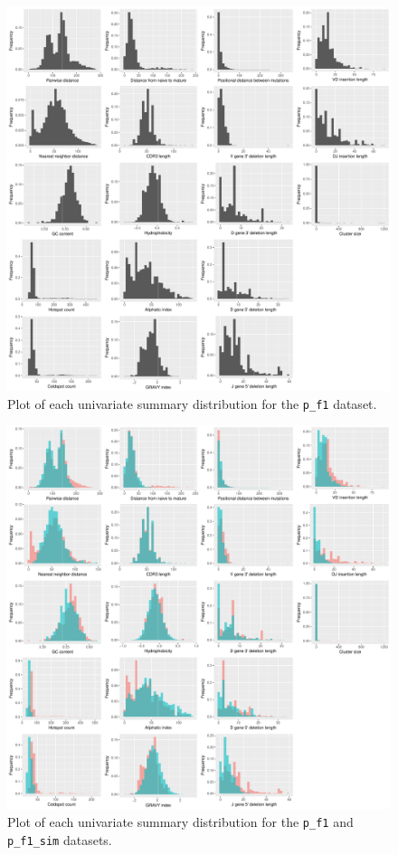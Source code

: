 \documentclass{article}
\begin{document}
\begin{figure}
    \includegraphics[width=\linewidth]{Figures/master_plot.pdf}
    \caption{Plot of each univariate summary distribution for the \texttt{p\_f1} dataset.}
    \label{fig:MasterPlot}
\end{figure}

\begin{figure}
    \includegraphics[width=\linewidth]{Figures/master_plot_double.pdf}
    \caption{Plot of each univariate summary distribution for the \texttt{p\_f1} and \texttt{p\_f1\_sim} datasets.}
    \label{fig:MasterPlotDouble}
\end{figure}
\end{document}

